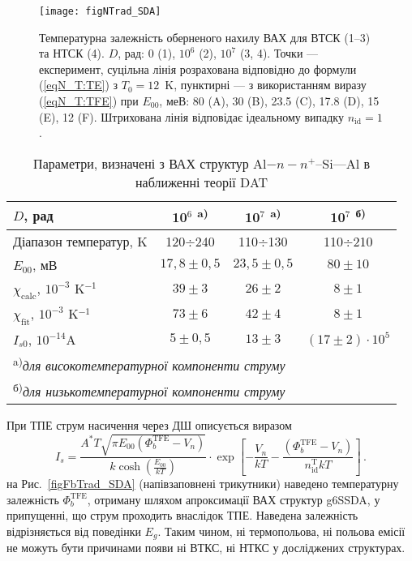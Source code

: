\begin{figure}
\center
\texttt{[image: figNTrad\_SDA]}
\caption{\label{figNTrad_SDA}
Температурна залежність оберненого нахилу ВАХ для ВТСК (1--3)
та НТСК (4).
$D$, рад: $0$ (1), $10^6$ (2), $10^7$ (3, 4).
Точки --- експеримент,
суцільна лінія розрахована відповідно до формули (\ref{eqN_T:TE}) з $T_0=12$~K,
пунктирні --- з використанням виразу (\ref{eqN_T:TFE}) при
$E_{00}$, меВ: 80 (A), 30 (B), 23.5 (C), 17.8 (D), 15 (E), 12 (F).
Штрихована лінія відповідає ідеальному випадку $n_{\mathrm{id}}=1$.
}%
\end{figure}


\begin{table}
\caption{Параметри, визначені з ВАХ структур Al$-n-n^+$--Si---Al в наближенні теорії DAT}
\label{tabSDAParRad:DAT}
\centering
\begin{tabular}{|l|c|c|c|}
\hline
$D$, рад &10$^6$ \textsuperscript{ a)}&10$^7$ \textsuperscript{ a)}&10$^7$ \textsuperscript{ б)}\\ \hline
Діапазон температур, K&120$\div$240&110$\div$130&110$\div$210\\
$E_{00}$, мВ&$17,8\pm0,5$&$23,5\pm0,5$&$80\pm10$\\
$\chi_\mathrm{calc}$, $10^{-3}$ K$^{-1}$&$39\pm3$&$26\pm2$&$8\pm1$\\
$\chi_\mathrm{fit}$, $10^{-3}$ K$^{-1}$&$73\pm6$&$42\pm4$&$8\pm1$\\
$I_{s0}$, $10^{-14}$A&$5\pm0,5$&$13\pm3$&$(17\pm2)\cdot10^{5}$\\
\hline
\multicolumn{4}{l}{\textsuperscript{ a)}\emph{для високотемпературної компоненти струму}}\\
\multicolumn{4}{l}{\textsuperscript{ б)}\emph{для низькотемпературної компоненти струму}}\\
\end{tabular}
\end{table}

При ТПЕ струм насичення через ДШ описується виразом \cite{Rhoderick1988, Roul}
\begin{equation}\label{eqIs:TFE}
  I_s=\frac{A^*T\sqrt{\pi{E_{00}}(\Phi_b^\mathrm{TFE}-V_n)}}{k\cosh\left(\frac{E_{00}}{kT}\right)}\cdot
  \exp\left[-\frac{V_n}{kT}-\frac{(\Phi_b^\mathrm{TFE}-V_n)}{n_{\mathrm{id}}^\mathrm{T}kT}\right]\,.
\end{equation}
на Рис.~\ref{figFbTrad_SDA} (напівзаповнені трикутники) наведено температурну залежність $\Phi_b^\mathrm{TFE}$, отриману шляхом апроксимації ВАХ структур g6SSDA,
у припущенні, що струм проходить внаслідок ТПЕ.
Наведена залежність відрізняється від поведінки $E_g$.
Таким чином, ні термопольова, ні польова емісії не можуть бути причинами появи ні ВТКС, ні НТКС у досліджених структурах.

